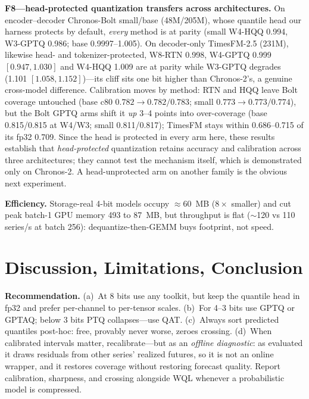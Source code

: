 \documentclass{article}
\begin{document}
\vspace{1pt}\noindent\textbf{F8---head-protected quantization transfers across
architectures.} On encoder--decoder Chronos-Bolt small/base (48M/205M), whose quantile
head our harness protects by default, \emph{every} method is at parity (small W4-HQQ
0.994, W3-GPTQ 0.986; base 0.9997--1.005). On decoder-only TimesFM-2.5 (231M), likewise
head- and tokenizer-protected, W8-RTN 0.998, W4-GPTQ 0.999 $[0.947,1.030]$ and W4-HQQ
1.009 are at parity while W3-GPTQ degrades (1.101 $[1.058,1.152]$)---its cliff sits one
bit higher than Chronos-2's, a genuine cross-model difference. Calibration moves by
method: RTN and HQQ leave Bolt coverage untouched (base c80 $0.782\to0.782/0.783$; small
$0.773\to0.773/0.774$), but the Bolt GPTQ arms shift it \emph{up} 3--4 points into
over-coverage (base 0.815/0.815 at W4/W3; small 0.811/0.817); TimesFM stays within
0.686--0.715 of its fp32 0.709. Since the head is protected in every arm here, these
results establish that \emph{head-protected} quantization retains accuracy and
calibration across three architectures; they cannot test the mechanism itself, which is
demonstrated only on Chronos-2. A head-unprotected arm on another family is the obvious
next experiment.

\vspace{1pt}\noindent\textbf{Efficiency.} Storage-real 4-bit models occupy $\approx$60~MB
($8\times$ smaller) and cut peak batch-1 GPU memory 493 to 87~MB, but throughput is
flat ($\sim$120 vs 110 series/s at batch 256): dequantize-then-GEMM buys footprint, not
speed.

\section{Discussion, Limitations, Conclusion}
\textbf{Recommendation.} (a)~At 8 bits use any toolkit, but keep the quantile head in
fp32 and prefer per-channel to per-tensor scales. (b)~For 4--3 bits use GPTQ or GPTAQ;
below 3 bits PTQ collapses---use QAT. (c)~Always sort predicted quantiles post-hoc: free,
provably never worse, zeroes crossing. (d)~When calibrated intervals matter,
recalibrate---but as an \emph{offline diagnostic}: as evaluated it draws residuals from
other series' realized futures, so it is not an online wrapper, and it restores coverage
without restoring forecast quality. Report calibration, sharpness, and crossing alongside
WQL whenever a probabilistic model is compressed.
\end{document}
